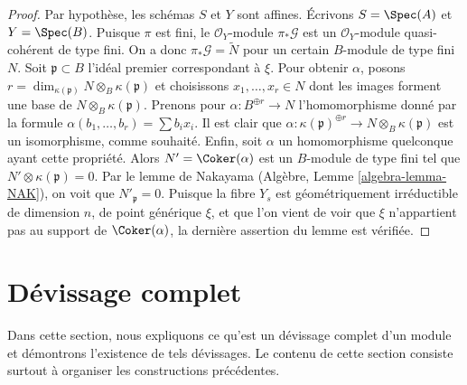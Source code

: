 \begin{proof}
Par hypothèse, les schémas $S$ et $Y$ sont affines.
Écrivons $S = \Spec(A)$ et $Y = \Spec(B)$.
Puisque $\pi$ est fini, le $\mathcal{O}_Y$-module $\pi_*\mathcal{G}$
est un $\mathcal{O}_Y$-module quasi-cohérent de type fini.
On a donc $\pi_*\mathcal{G} = \widetilde{N}$ pour un certain $B$-module de type fini $N$.
Soit $\mathfrak p \subset B$ l'idéal premier correspondant à $\xi$.
Pour obtenir $\alpha$, posons
$r = \dim_{\kappa(\mathfrak p)} N \otimes_B \kappa(\mathfrak p)$
et choisissons $x_1, \ldots, x_r \in N$ dont les images forment une base de
$N \otimes_B \kappa(\mathfrak p)$. Prenons pour $\alpha : B^{\oplus r} \to N$
l'homomorphisme donné par la formule $\alpha(b_1, \ldots, b_r) = \sum b_ix_i$.
Il est clair que
$\alpha : \kappa(\mathfrak p)^{\oplus r} \to N \otimes_B \kappa(\mathfrak p)$
est un isomorphisme, comme souhaité. Enfin, soit $\alpha$ un homomorphisme quelconque ayant cette
propriété. Alors $N' = \Coker(\alpha)$ est un $B$-module de type fini
tel que $N' \otimes \kappa(\mathfrak p) = 0$. Par le lemme de Nakayama
(Algèbre, Lemme \ref{algebra-lemma-NAK}),
on voit que $N'_{\mathfrak p} = 0$. Puisque la fibre $Y_s$ est
géométriquement irréductible de dimension $n$, de point générique $\xi$,
et que l'on vient de voir que $\xi$ n'appartient pas au support de
$\Coker(\alpha)$, la dernière assertion du lemme est vérifiée.
\end{proof}


\section{D\'evissage complet}
\label{section-complete-devissage}

\noindent
Dans cette section, nous expliquons ce qu'est un d\'evissage complet d'un
module et démontrons l'existence de tels dévissages. Le contenu de cette
section consiste surtout à organiser les constructions précédentes.

